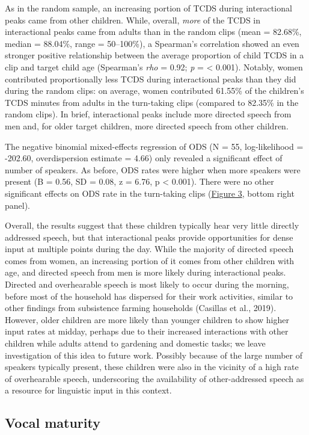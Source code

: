 \documentclass[,man,mask,floatsintext]{apa6}
\begin{document}
As in the random sample, an increasing portion of TCDS during
interactional peaks came from other children. While, overall,
\emph{more} of the TCDS in interactional peaks came from adults than in
the random clips (mean = 82.68\%, median = 88.04\%, range = 50--100\%),
a Spearman's correlation showed an even stronger positive relationship
between the average proportion of child TCDS in a clip and target child
age (Spearman's \emph{rho} = 0.92; \emph{p} = \textless{} 0.001).
Notably, women contributed proportionally less TCDS during interactional
peaks than they did during the random clips: on average, women
contributed 61.55\% of the children's TCDS minutes from adults in the
turn-taking clips (compared to 82.35\% in the random clips). In brief,
interactional peaks include more directed speech from men and, for older
target children, more directed speech from other children.

The negative binomial mixed-effects regression of ODS (N = 55,
log-likelihood = -202.60, overdispersion estimate = 4.66) only revealed
a significant effect of number of speakers. As before, ODS rates were
higher when more speakers were present (B = 0.56, SD = 0.08, z = 6.76, p
\textless{} 0.001). There were no other significant effects on ODS rate
in the turn-taking clips (\protect\hyperlink{fig3}{Figure 3}, bottom
right panel).

Overall, the results suggest that these children typically hear very
little directly addressed speech, but that interactional peaks provide
opportunities for dense input at multiple points during the day. While
the majority of directed speech comes from women, an increasing portion
of it comes from other children with age, and directed speech from men
is more likely during interactional peaks. Directed and overhearable
speech is most likely to occur during the morning, before most of the
household has dispersed for their work activities, similar to other
findings from subsistence farming households (Casillas et al., 2019).
However, older children are more likely than younger children to show
higher input rates at midday, perhaps due to their increased
interactions with other children while adults attend to gardening and
domestic tasks; we leave investigation of this idea to future work.
Possibly because of the large number of speakers typically present,
these children were also in the vicinity of a high rate of overhearable
speech, underscoring the availability of other-addressed speech as a
resource for linguistic input in this context.

\subsection{Vocal maturity}\label{vocal-maturity}
\end{document}
